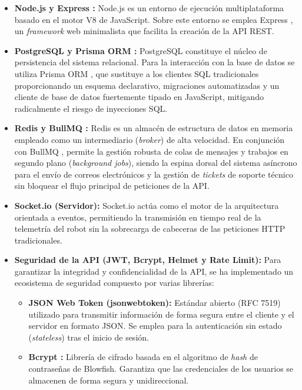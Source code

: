 \begin{itemize}
    \item \textbf{Node.js \cite{nodejs} y Express \cite{express}:} Node.js \cite{nodejs} es un entorno de ejecución multiplataforma basado en el motor V8 de JavaScript. Sobre este entorno se emplea Express \cite{express}, un \textit{framework} web minimalista que facilita la creación de la API REST.
    \item \textbf{PostgreSQL \cite{postgresql} y Prisma ORM \cite{prisma}:} PostgreSQL \cite{postgresql} constituye el núcleo de persistencia del sistema relacional. Para la interacción con la base de datos se utiliza Prisma ORM \cite{prisma}, que sustituye a los clientes SQL tradicionales proporcionando un esquema declarativo, migraciones automatizadas y un cliente de base de datos fuertemente tipado en JavaScript, mitigando radicalmente el riesgo de inyecciones SQL.
    \item \textbf{Redis \cite{redis} y BullMQ \cite{bullmq}:} Redis \cite{redis} es un almacén de estructura de datos en memoria empleado como un intermediario (\textit{broker}) de alta velocidad. En conjunción con BullMQ \cite{bullmq}, permite la gestión robusta de colas de mensajes y trabajos en segundo plano (\textit{background jobs}), siendo la espina dorsal del sistema asíncrono para el envío de correos electrónicos y la gestión de \textit{tickets} de soporte técnico sin bloquear el flujo principal de peticiones de la API.
    \item \textbf{Socket.io \cite{socketio} (Servidor):} Socket.io \cite{socketio} actúa como el motor de la arquitectura orientada a eventos, permitiendo la transmisión en tiempo real de la telemetría del robot sin la sobrecarga de cabeceras de las peticiones HTTP tradicionales.
    \item \textbf{Seguridad de la API (JWT, Bcrypt, Helmet y Rate Limit):} Para garantizar la integridad y confidencialidad de la API, se ha implementado un ecosistema de seguridad compuesto por varias librerías:
    \begin{itemize}
        \item \textbf{JSON Web Token \cite{jwt} (jsonwebtoken):} Estándar abierto (RFC 7519) utilizado para transmitir información de forma segura entre el cliente y el servidor en formato JSON. Se emplea para la autenticación sin estado (\textit{stateless}) tras el inicio de sesión.
        \item \textbf{Bcrypt \cite{bcrypt}:} Librería de cifrado basada en el algoritmo de \textit{hash} de contraseñas de Blowfish. Garantiza que las credenciales de los usuarios se almacenen de forma segura y unidireccional.

\end{itemize}
\end{itemize}
